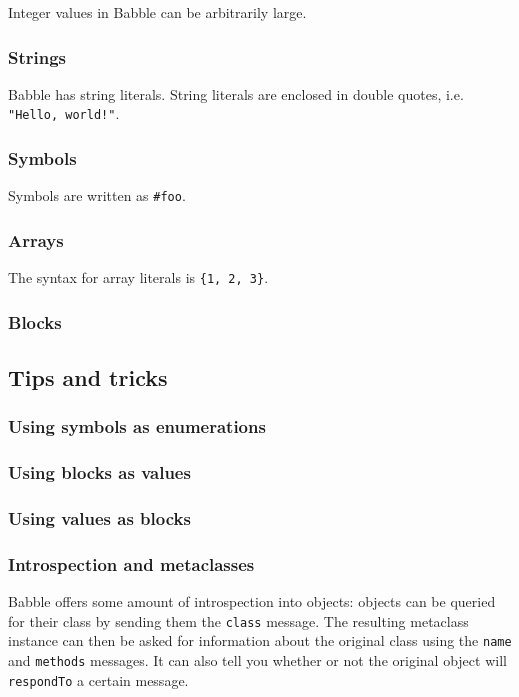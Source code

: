 \documentclass[a4paper]{article}
\begin{document}
Integer values in Babble can be arbitrarily large.

\subsubsection{Strings}

Babble has string literals. String literals are enclosed in double quotes, i.e. \verb|"Hello, world!"|.

\subsubsection{Symbols}

Symbols are written as \verb|#foo|.

\subsubsection{Arrays}

The syntax for array literals is \verb|{1, 2, 3}|.

\subsubsection{Blocks}

\subsection{Tips and tricks}

\subsubsection{Using symbols as enumerations}



\subsubsection{Using blocks as values}

\subsubsection{Using values as blocks}

\subsubsection{Introspection and metaclasses}

Babble offers some amount of introspection into objects: objects can be queried for their class by sending them the \texttt{class} message.
The resulting metaclass instance can then be asked for information about the original class using the \texttt{name} and \texttt{methods} messages.
It can also tell you whether or not the original object will \texttt{respondTo} a certain message.
\end{document}
